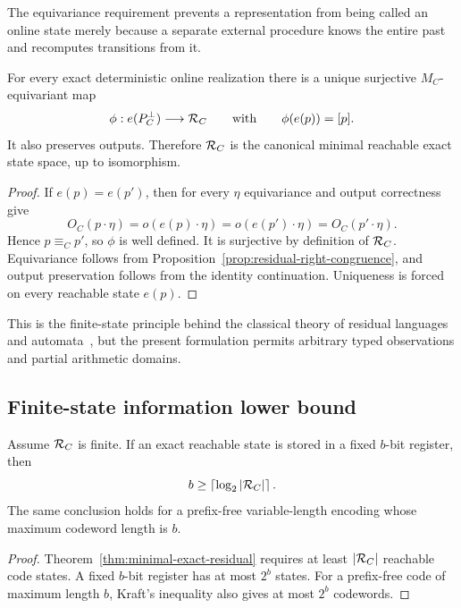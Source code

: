 The equivariance requirement prevents a representation from being called an
online state merely because a separate external procedure knows the entire
past and recomputes transitions from it.

\begin{theorem}
\label{thm:minimal-exact-residual}
For every exact deterministic online realization there is a unique surjective
$M_C$-equivariant map
\[
  \phi:e(P_C^\bot)\longrightarrow\mathcal R_C
  \qquad\text{with}\qquad
  \phi(e(p))=[p].
\]
It also preserves outputs.  Therefore $\mathcal R_C$ is the canonical minimal
reachable exact state space, up to isomorphism.
\end{theorem}

\begin{proof}
If $e(p)=e(p')$, then for every $\eta$ equivariance and output correctness give
\[
 O_C(p\cdot\eta)
 =o(e(p)\cdot\eta)
 =o(e(p')\cdot\eta)
 =O_C(p'\cdot\eta).
\]
Hence $p\equiv_Cp'$, so $\phi$ is well defined.  It is surjective by definition
of $\mathcal R_C$.  Equivariance follows from
Proposition~\ref{prop:residual-right-congruence}, and output preservation follows
from the identity continuation.  Uniqueness is forced on every reachable state
$e(p)$.
\end{proof}

This is the finite-state principle behind the classical theory of residual
languages and automata~\cite{Nerode1958}, but the present formulation permits
arbitrary typed observations and partial arithmetic domains.

\subsection{Finite-state information lower bound}

\begin{corollary}
\label{cor:residual-bit-bound}
Assume $\mathcal R_C$ is finite.  If an exact reachable state is stored in a fixed
$b$-bit register, then
\begin{equation}
  b\ge \left\lceil\log_2|\mathcal R_C|\right\rceil.
  \label{eq:residual-bit-bound}
\end{equation}
The same conclusion holds for a prefix-free variable-length encoding whose
maximum codeword length is $b$.
\end{corollary}

\begin{proof}
Theorem~\ref{thm:minimal-exact-residual} requires at least $|\mathcal R_C|$ reachable
code states.  A fixed $b$-bit register has at most $2^b$ states.  For a
prefix-free code of maximum length $b$, Kraft's inequality also gives at most
$2^b$ codewords.
\end{proof}


